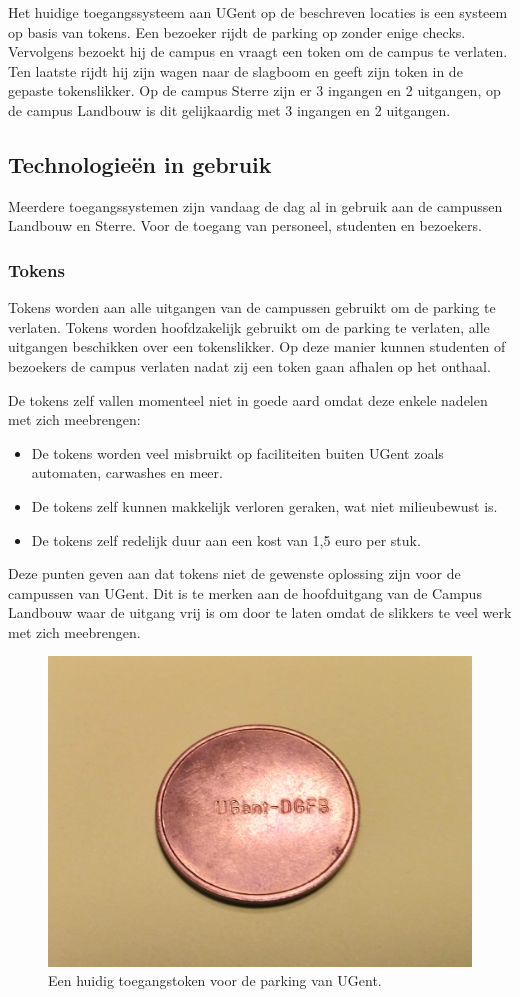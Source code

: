 Het huidige toegangssysteem aan UGent op de beschreven locaties is een systeem op basis van tokens. Een bezoeker rijdt de parking op zonder enige checks. Vervolgens bezoekt hij de campus en vraagt een token om de campus te verlaten. Ten laatste rijdt hij zijn wagen naar de slagboom en geeft zijn token in de gepaste tokenslikker.
Op de campus Sterre zijn er 3 ingangen en 2 uitgangen, op de campus Landbouw is dit gelijkaardig met 3 ingangen en 2 uitgangen.

\subsection{Technologieën in gebruik}
Meerdere toegangssystemen zijn vandaag de dag al in gebruik aan de campussen Landbouw en Sterre. Voor de toegang van personeel, studenten en bezoekers.

\subsubsection{Tokens}

Tokens worden aan alle uitgangen van de campussen gebruikt om de parking te verlaten.
Tokens worden hoofdzakelijk gebruikt om de parking te verlaten, alle uitgangen beschikken over een tokenslikker. Op deze manier kunnen studenten of bezoekers de campus verlaten nadat zij een token gaan afhalen op het onthaal.

De tokens zelf vallen momenteel niet in goede aard omdat deze enkele nadelen met zich meebrengen:
\begin{itemize}
	\item De tokens worden veel misbruikt op faciliteiten buiten UGent zoals automaten, carwashes en meer.
	\item De tokens zelf kunnen makkelijk verloren geraken, wat niet milieubewust is.
	\item De tokens zelf redelijk duur aan een kost van 1,5 euro per stuk.
\end{itemize}

Deze punten geven aan dat tokens niet de gewenste oplossing zijn voor de campussen van UGent. Dit is te merken aan de hoofduitgang van de Campus Landbouw waar de uitgang vrij is om door te laten omdat de slikkers te veel werk met zich meebrengen.

\begin{figure}[h!]
	\centering
	\includegraphics[width=0.5\linewidth]{img/token.jpg}
	\caption{Een huidig toegangstoken voor de parking van UGent.}
\end{figure}

